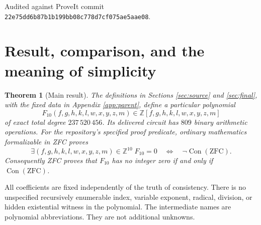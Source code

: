 \documentclass[11pt,a4paper]{article}
\newtheorem{theorem}{Theorem}[section]
\theoremstyle{remark}
\newcommand{\Z}{\mathbb Z}
\newcommand{\Con}{\operatorname{Con}}
\newcommand{\pin}{\texttt{22e75dd6b87b1b199bb08c778d7cf075ae5aae08}}
\begin{document}
\begin{titlepage}
\begin{abstract}
We prove the new source adapter, give the complete final polynomial by
finite arithmetic definitions, and compose it with the inherited compiler
endpoint and Sun's Lucas/interpolation theorems. The conclusion is
\(\mathrm{ZFC}\vdash [\,\forall\mathbf v\in\Z^{10},\
F_{10}(\mathbf v)\ne0\,]\leftrightarrow\Con(\mathrm{ZFC})\).
The archive includes coefficient bytes, deterministic generators,
independent algebraic checks, and exact-degree certificates. This is an
ordinary mathematical proof, not a new end-to-end proof-assistant
certificate or a claim of global minimality.
\end{abstract}
\vfill
{\small Audited against ProveIt commit\\\pin.}
\end{titlepage}
\hypersetup{pageanchor=true}
\tableofcontents
\newpage

\section{Result, comparison, and the meaning of simplicity}
\begin{theorem}[Main result]\label{thm:main}
The definitions in Sections \ref{sec:source} and \ref{sec:final},
with the fixed data in Appendix \ref{app:parent}, define a particular
polynomial
\[
F_{10}(f,g,h,k,l,w,x,y,z,m)\in
\Z[f,g,h,k,l,w,x,y,z,m]
\]
of exact total degree \(237\,520\,456\). Its delivered circuit has \(809\)
binary arithmetic operations. For the repository's specified proof
predicate, ordinary mathematics formalizable in ZFC proves
\begin{equation}\label{eq:main}
\exists(f,g,h,k,l,w,x,y,z,m)\in\Z^{10}\;F_{10}=0
\quad\Longleftrightarrow\quad \neg\Con(\mathrm{ZFC}).
\end{equation}
Consequently ZFC proves that \(F_{10}\) has no integer zero if and only if
\(\Con(\mathrm{ZFC})\).
\end{theorem}
All coefficients are fixed independently of the truth of consistency.
There is no unspecified recursively enumerable index, variable exponent,
radical, division, or hidden existential witness in the polynomial.
The intermediate names are polynomial abbreviations. They are not
additional unknowns.
\end{document}
